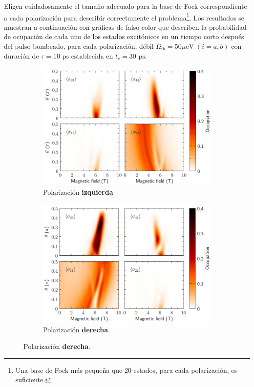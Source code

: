 \documentclass[../main.tex]{subfiles}
\begin{document}
Eligen cuidadosamente el tamaño adecuado para la base de Fock correspondiente a cada polarización para describir correctamente el problema\footnote{Una base de Fock más pequeña que 20 estados, para cada polarización, es suficiente.}. Los resultados se muestran a continuación con gráficas de falso color que describen la probabilidad de ocupación de cada uno de los estados excitónicos en un tiempo corto después del pulso bombeado, para cada polarización, débil $\Omega_{0i}= 50\text{$\mu$eV}\; (i=a,b)$ con duración de $\tau=10\text{ ps}$ establecida en $t_c = 30\text{ ps}$:

\begin{figure}
	\centering
	
	\begin{subfigure}{0.49\textwidth}
		\centering
		\includegraphics[width=\linewidth]{img/populationMagneticLeft}
		\caption{Polarización \textbf{izquierda}}
		\label{fig:populationmagneticleft}
	\end{subfigure}
	\hfill
	\begin{subfigure}{0.49\textwidth}
		\centering
		\includegraphics[width=\linewidth]{img/populationMagneticRight}
		\caption{Polarización \textbf{derecha}.}
		\label{fig:populationmagneticright}
	\end{subfigure}
	

\end{figure}
\end{document}
